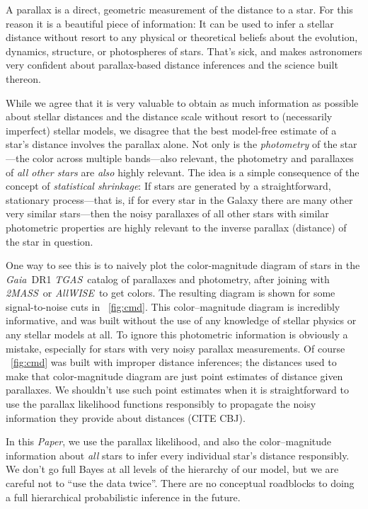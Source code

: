 \documentclass[12pt]{article}
\newcommand{\documentname}{\textsl{Paper}}
\newcommand{\project}[1]{\textsl{#1}}
\newcommand{\acronym}[1]{\small{#1}}
\newcommand{\gaia}{\project{Gaia}}
\newcommand{\tgas}{\project{\acronym{TGAS}}}
\newcommand{\twomass}{\project{\acronym{2MASS}}}
\newcommand{\wise}{\project{All\acronym{WISE}}}
\begin{document}
A parallax is a direct, geometric measurement of the distance to a star.
For this reason it is a beautiful piece of information: It can be used
to infer a stellar distance without resort to any physical or
theoretical beliefs about the evolution, dynamics, structure, or
photospheres of stars.
That's sick, and makes astronomers very confident about parallax-based
distance inferences and the science built thereon.

While we agree that it is very valuable to obtain as much information
as possible about stellar distances and the distance scale without
resort to (necessarily imperfect) stellar models, we disagree that the
best model-free estimate of a star's distance involves the parallax
alone.
Not only is the \emph{photometry} of the star---the color across
multiple bands---also relevant, the photometry and parallaxes of
\emph{all other stars} are \emph{also} highly relevant.
The idea is a simple consequence of the concept of \emph{statistical shrinkage}:
If stars are generated by a straightforward, stationary process---that
is, if for every star in the Galaxy there are many other very similar
stars---then the noisy parallaxes of all other stars with similar
photometric properties are highly relevant to the inverse parallax
(distance) of the star in question.

One way to see this is to naively plot the color-magnitude diagram of
stars in the \gaia\ \acronym{DR1} \tgas\ catalog of parallaxes and
photometry, after joining with \twomass\ or \wise\ to get colors.
The resulting diagram is shown for some signal-to-noise cuts in
\figurename~\ref{fig:cmd}.
This color--magnitude diagram is incredibly informative, and was built
without the use of any knowledge of stellar physics or any stellar models at all.
To ignore this photometric information is obviously a mistake, especially for
stars with very noisy parallax measurements.
Of course \figurename~\ref{fig:cmd} was built with improper distance
inferences; the distances used to make that color-magnitude diagram
are just point estimates of distance given parallaxes.
We shouldn't use such point estimates when it is straightforward to
use the parallax likelihood functions responsibly to propagate the noisy
information they provide about distances (CITE CBJ).

In this \documentname, we use the parallax likelihood, and also the
color--magnitude information about \emph{all} stars to infer every
individual star's distance responsibly.
We don't go full Bayes at all levels of the hierarchy of our model,
but we are careful not to ``use the data twice''.
There are no conceptual roadblocks to doing a full hierarchical
probabilistic inference in the future.
\end{document}
